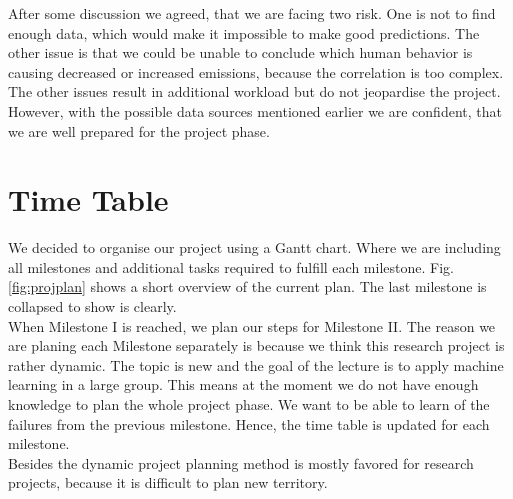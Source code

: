 \documentclass[lang=english,inputenc=utf8,fontsize=10pt]{ldvarticle}
\begin{document}
After some discussion we agreed, that we are facing two risk. One is not to find enough data, which would make it impossible to make good predictions. The other issue is that we could be unable to conclude which human behavior is causing decreased or increased emissions, because the correlation is too complex.\\
The other issues result in additional workload but do not jeopardise the project. However, with the possible data sources mentioned earlier we are confident, that we are well prepared for the project phase.\\



\section{Time Table}

We decided to organise our project using a Gantt chart. Where we are including all milestones and additional tasks required to fulfill each milestone. Fig. \ref{fig:projplan} shows a short overview of the current plan. The last milestone is collapsed to show is clearly.\\
When Milestone I is reached, we plan our steps for Milestone II. The reason we are planing each Milestone separately is because we think this research project is rather dynamic. The topic is new and the goal of the lecture is to apply machine learning in a large group. This means at the moment we do not have enough knowledge to plan the whole project phase. We want to be able to learn of the failures from the previous milestone. Hence, the time table is updated for each milestone.\\
Besides the dynamic project planning method is mostly favored for research projects, because it is difficult to plan new territory.\\


\begin{figure}[ht]
\end{figure}
\end{document}
